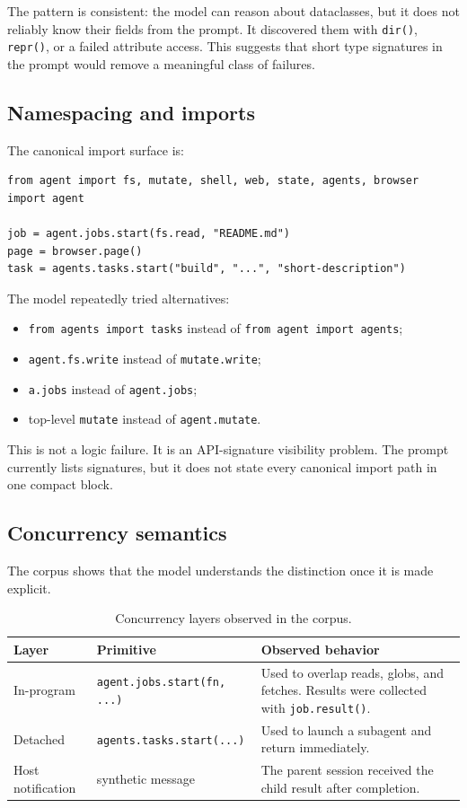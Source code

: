 \documentclass[11pt]{article}
\newcommand{\code}[1]{\texttt{#1}}
\begin{document}
The pattern is consistent: the model can reason about dataclasses, but it does
not reliably know their fields from the prompt.  It discovered them with
\code{dir()}, \code{repr()}, or a failed attribute access.  This suggests that
short type signatures in the prompt would remove a meaningful class of failures.

\subsection{Namespacing and imports}

The canonical import surface is:

\begin{lstlisting}[style=python]
from agent import fs, mutate, shell, web, state, agents, browser
import agent

job = agent.jobs.start(fs.read, "README.md")
page = browser.page()
task = agents.tasks.start("build", "...", "short-description")
\end{lstlisting}

The model repeatedly tried alternatives:

\begin{itemize}[leftmargin=1.5em]
\item \code{from agents import tasks} instead of \code{from agent import agents};
\item \code{agent.fs.write} instead of \code{mutate.write};
\item \code{a.jobs} instead of \code{agent.jobs};
\item top-level \code{mutate} instead of \code{agent.mutate}.
\end{itemize}

This is not a logic failure.  It is an API-signature visibility problem.  The
prompt currently lists signatures, but it does not state every canonical import
path in one compact block.

\subsection{Concurrency semantics}

The corpus shows that the model understands the distinction once it is made
explicit.

\begin{table}[h]
\centering
\small
\begin{tabular}{p{3.2cm}p{4.6cm}p{6.2cm}}
\toprule
\textbf{Layer} & \textbf{Primitive} & \textbf{Observed behavior} \\
\midrule
In-program & \code{agent.jobs.start(fn, ...)} & Used to overlap reads, globs, and fetches.  Results were collected with \code{job.result()}. \\
Detached & \code{agents.tasks.start(...)} & Used to launch a subagent and return immediately. \\
Host notification & synthetic message & The parent session received the child result after completion. \\
\bottomrule
\end{tabular}
\caption{Concurrency layers observed in the corpus.}
\end{table}
\end{document}
